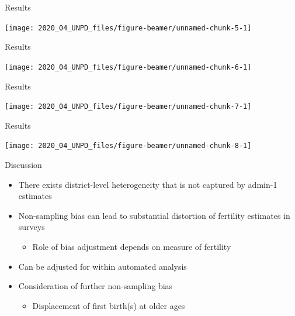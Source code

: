\documentclass[ignorenonframetext,]{beamer}
\providecommand{\tightlist}{%
  \setlength{\itemsep}{0pt}\setlength{\parskip}{0pt}}
\begin{document}
\begin{frame}{Results}
\protect\hypertarget{results}{}

\begin{center}\texttt{[image: 2020\_04\_UNPD\_files/figure-beamer/unnamed-chunk-5-1]} \end{center}

\end{frame}

\begin{frame}{Results}
\protect\hypertarget{results-1}{}

\begin{center}\texttt{[image: 2020\_04\_UNPD\_files/figure-beamer/unnamed-chunk-6-1]} \end{center}

\end{frame}

\begin{frame}{Results}
\protect\hypertarget{results-2}{}

\begin{center}\texttt{[image: 2020\_04\_UNPD\_files/figure-beamer/unnamed-chunk-7-1]} \end{center}

\end{frame}

\begin{frame}{Results}
\protect\hypertarget{results-3}{}

\begin{center}\texttt{[image: 2020\_04\_UNPD\_files/figure-beamer/unnamed-chunk-8-1]} \end{center}

\end{frame}

\begin{frame}{Discussion}
\protect\hypertarget{discussion}{}

\begin{itemize}
\tightlist
\item
  There exists district-level heterogeneity that is not captured by
  admin-1 estimates
\item
  Non-sampling bias can lead to substantial distortion of fertility
  estimates in surveys

  \begin{itemize}
  \tightlist
  \item
    Role of bias adjustment depends on measure of fertility
  \end{itemize}
\item
  Can be adjusted for within automated analysis
\item
  Consideration of further non-sampling bias

  \begin{itemize}
  \tightlist
  \item
    Displacement of first birth(s) at older ages
  \end{itemize}
\end{itemize}

\end{frame}
\end{document}
